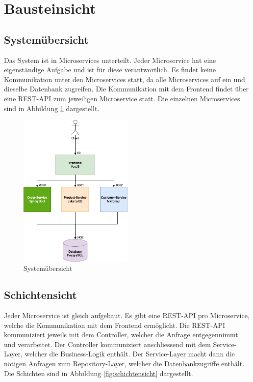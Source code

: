 
\section{Bausteinsicht}
\label{sec:bausteinsicht}

\subsection{Systemübersicht}
\label{subsec:systemuebersicht}
Das System ist in Microservices unterteilt. Jeder Microservice hat eine eigenständige Aufgabe und ist für diese verantwortlich. Es findet keine Kommunikation unter den Microservices statt, da alle Microservices auf ein und dieselbe Datenbank zugreifen.
Die Kommunikation mit dem Frontend findet über eine REST-API zum jeweiligen Microservice statt. Die einzelnen Microservices sind in Abbildung \ref{fig:systemuebersicht} dargestellt.

\begin{figure}[H]
    \centering
    \includegraphics[width=0.5\textwidth]{../images/bausteinsicht/systemarchitektur.png}
    \caption{Systemübersicht}
    \label{fig:systemuebersicht}
\end{figure}

\subsection{Schichtensicht}
\label{subsec:schichtensicht}
Jeder Microservice ist gleich aufgebaut. Es gibt eine REST-API pro Microservice, welche die Kommunikation mit dem Frontend ermöglicht. Die REST-API kommuniziert jeweils mit dem Controller, welcher die Anfrage entgegennimmt und verarbeitet. Der Controller kommuniziert anschliessend mit dem Service-Layer, welcher die Business-Logik enthält. Der Service-Layer macht dann die nötigen Anfragen zum Repository-Layer, welcher die Datenbankzugriffe enthält. Die Schichten sind in Abbildung \ref{fig:schichtensicht} dargestellt.

